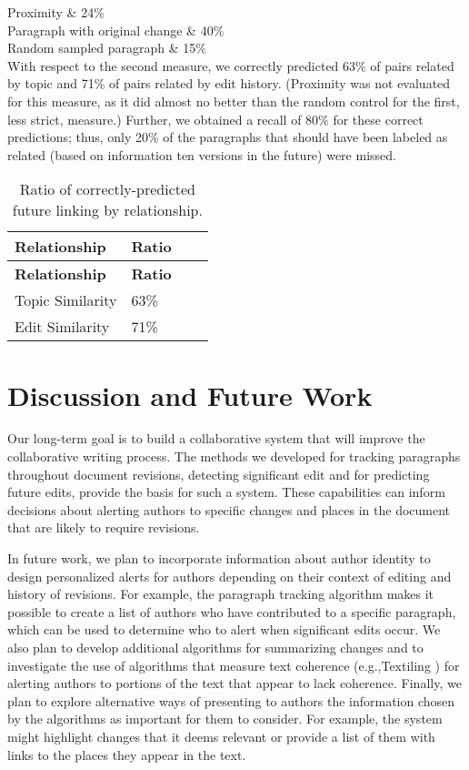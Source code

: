 Proximity \& 24\%\\

Paragraph with original change \& 40\%\\

Random sampled paragraph \& 15\%\\

With respect to the second measure, we correctly predicted 63\% of pairs
related by topic and 71\% of pairs related by edit history. (Proximity
was not evaluated for this measure, as it did almost no better than the
random control for the first, less strict, measure.) Further, we
obtained a recall of 80\% for these correct predictions; thus, only 20\%
of the paragraphs that should have been labeled as related (based on
information ten versions in the future) were missed.

\begin{longtable}[c]{@{}llll@{}}
\caption{Ratio of correctly-predicted future linking by
relationship.{}}\tabularnewline
\toprule
\textbf{Relationship} & \textbf{Ratio} & &\tabularnewline
\midrule
\endfirsthead
\toprule
\textbf{Relationship} & \textbf{Ratio} & &\tabularnewline
\midrule
\endhead
Topic Similarity & 63\% & &\tabularnewline
Edit Similarity & 71\% & &\tabularnewline
\bottomrule
\end{longtable}

\section{Discussion and Future Work}\label{discussion-and-future-work}

Our long-term goal is to build a collaborative system that will improve
the collaborative writing process. The methods we developed for tracking
paragraphs throughout document revisions, detecting significant edit and
for predicting future edits, provide the basis for such a system. These
capabilities can inform decisions about alerting authors to specific
changes and places in the document that are likely to require revisions.

In future work, we plan to incorporate information about author identity
to design personalized alerts for authors depending on their context of
editing and history of revisions. For example, the paragraph tracking
algorithm makes it possible to create a list of authors who have
contributed to a specific paragraph, which can be used to determine who
to alert when significant edits occur. We also plan to develop
additional algorithms for summarizing changes and to investigate the use
of algorithms that measure text coherence (e.g.,Textiling
\cite{hearst1994multi}) for alerting authors to portions of the text
that appear to lack coherence. Finally, we plan to explore alternative
ways of presenting to authors the information chosen by the algorithms
as important for them to consider. For example, the system might
highlight changes that it deems relevant or provide a list of them with
links to the places they appear in the text.
